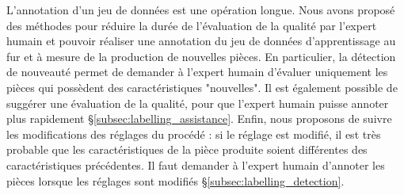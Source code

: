L'annotation d'un jeu de données est une opération longue.
Nous avons proposé des méthodes pour réduire la durée de l'évaluation de la qualité par l'expert humain et pouvoir réaliser une annotation du jeu de données d'apprentissage au fur et à mesure de la production de nouvelles pièces.
En particulier, la détection de nouveauté permet de demander à l'expert humain d'évaluer uniquement les pièces qui possèdent des caractéristiques "nouvelles".
Il est également possible de suggérer une évaluation de la qualité, pour que l'expert humain puisse annoter plus rapidement §\ref{subsec:labelling_assistance}.
Enfin, nous proposons de suivre les modifications des réglages du procédé : si le réglage est modifié, il est très probable que les caractéristiques de la pièce produite soient différentes des caractéristiques précédentes.
Il faut demander à l'expert humain d'annoter les pièces lorsque les réglages sont modifiés §\ref{subsec:labelling_detection}.


%
%

\vspace{5cm}

